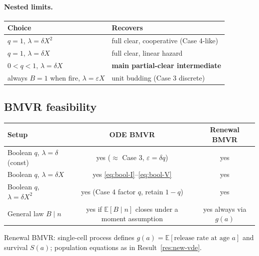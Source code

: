 \documentclass[11pt,a4paper]{article}
\newcommand{\E}{\mathbb{E}}
\theoremstyle{plain}
\theoremstyle{definition}
\theoremstyle{remark}
\begin{document}
\paragraph{Nested limits.}
\begin{center}
\renewcommand{\arraystretch}{1.15}
\begin{tabular}{@{}ll@{}}
\toprule
Choice & Recovers \\
\midrule
$q=1$, $\lambda=\delta X^2$ & full clear, cooperative (Case 4-like) \\
$q=1$, $\lambda=\delta X$ & full clear, linear hazard \\
$0<q<1$, $\lambda=\delta X$ & \textbf{main partial-clear intermediate} \\
always $B=1$ when fire, $\lambda=\varepsilon X$ & unit budding (Case 3 discrete) \\
\bottomrule
\end{tabular}
\end{center}

\subsection{BMVR feasibility}

\begin{center}
\renewcommand{\arraystretch}{1.2}
\begin{tabular}{@{}p{}cc@{}}
\toprule
Setup & ODE BMVR & Renewal BMVR \\
\midrule
Boolean $q$, $\lambda=\delta$ (const) & yes ($\approx$ Case 3, $\varepsilon=\delta q$) & yes \\
Boolean $q$, $\lambda=\delta X$ & yes \eqref{eq:bool-I}--\eqref{eq:bool-V} & yes \\
Boolean $q$, $\lambda=\delta X^2$ & yes (Case 4 factor $q$, retain $1-q$) & yes \\
General law $B\mid n$ & yes if $\E[B\mid n]$ closes under a moment assumption & yes always via $g(a)$ \\
\bottomrule
\end{tabular}
\end{center}

Renewal BMVR: single-cell process defines
$g(a)=\E[\text{release rate at age }a]$ and survival $S(a)$; population
equations as in Result~\ref{res:new-vde}.

\end{document}
